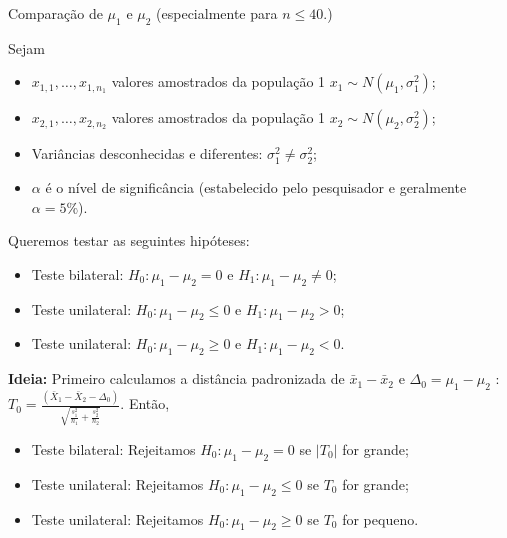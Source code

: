 \documentclass[9pt]{beamer}
\begin{document}
\begin{frame}{Comparação de $\mu_1$ e $\mu_2$ (especialmente para $n \leq 40$.)}

\small

Sejam
\begin{itemize}
	\item $x_{1,1}, \dots, x_{1, n_1}$ valores amostrados da população 1 $x_1 \sim N(\mu_1, \sigma_1^2)$;
	\item $x_{2,1}, \dots, x_{2, n_2}$ valores amostrados da população 1 $x_2 \sim N(\mu_2, \sigma_2^2)$;
	\item Variâncias desconhecidas e diferentes: $\sigma_1^2 \neq \sigma_2^2$;
	\item $\alpha$ é o nível de significância (estabelecido pelo pesquisador e geralmente $\alpha=5\%$). 
\end{itemize}
\vfill

Queremos testar as seguintes hipóteses:
\begin{itemize}
	\item Teste bilateral: $H_0: \mu_1 - \mu_2 = 0$ e $H_1: \mu_1 - \mu_2 \neq 0$;
	\item Teste unilateral: $H_0: \mu_1 - \mu_2 \leq 0$ e $H_1: \mu_1 - \mu_2 > 0$;
	\item Teste unilateral: $H_0: \mu_1 - \mu_2 \geq 0$ e $H_1: \mu_1 - \mu_2 < 0$.
\end{itemize}
\vfill

\textbf{Ideia:} Primeiro calculamos a distância padronizada de $\bar{x}_1 - \bar{x}_2$ e $\Delta_0=\mu_1 - \mu_2$ : $T_0 = \frac{(\bar{X}_1 - \bar{X}_2 - \Delta_0)}{\sqrt{\frac{s_1^2}{n_1} + \frac{s_2^2}{n_2}}}$. Então, 
\begin{itemize}
	\item Teste bilateral: Rejeitamos $H_0: \mu_1 - \mu_2 =0$ se $\lvert T_0 \rvert$ for grande;
	\item Teste unilateral: Rejeitamos $H_0: \mu_1 - \mu_2 \leq 0$ se $T_0 $ for grande;
	\item Teste unilateral: Rejeitamos $H_0: \mu_1 - \mu_2 \geq 0$ se $T_0 $ for pequeno.
\end{itemize}

\normalsize
\end{frame}
\end{document}
